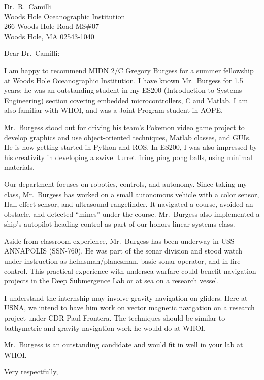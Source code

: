 \documentclass[12pt]{wrceletter}
\date{\today}
\begin{document}
\begin{letter}{%
Dr.~R.~Camilli\\
Woods Hole Oceanographic Institution\\
266 Woods Hole Road MS\#07\\
Woods Hole, MA 02543-1040}

\opening{Dear Dr.~Camilli:}
\raggedright %
\setlength{\parindent}{15pt} %

I am happy to recommend MIDN 2/C Gregory Burgess for a summer fellowship at Woods Hole Oceanographic Institution. I have known Mr.~Burgess for 1.5 years; he was an outstanding student in my ES200 (Introduction to Systems Engineering) section covering embedded microcontrollers, C and Matlab. I am also familiar with WHOI, and was a Joint Program student in AOPE. 

Mr.~Burgess stood out for driving his team's Pokemon video game project to develop graphics and use object-oriented techniques, Matlab classes, and GUIs. He is now getting started in Python and ROS. In ES200, I was also impressed by his creativity in developing a swivel turret firing ping pong balls, using minimal materials. 

Our department focuses on robotics, controls, and autonomy. Since taking my class, Mr.~Burgess has worked on a small autonomous vehicle with a color sensor, Hall-effect sensor, and ultrasound rangefinder. It navigated a course, avoided an obstacle, and detected ``mines'' under the course. Mr.~Burgess also implemented a ship's autopilot heading control as part of our honors linear systems class. 

Aside from classroom experience, Mr.~Burgess has been underway in USS ANNAPOLIS (SSN-760). He was part of the sonar division and stood watch under instruction as helmsman/planesman, basic sonar operator, and in fire control. This practical experience with undersea warfare could benefit navigation projects in the Deep Submergence Lab or at sea on a research vessel. 

I understand the internship may involve gravity navigation on gliders. Here at USNA, we intend to have him work on vector magnetic navigation on a research project under CDR Paul Frontera. The techniques should be similar to bathymetric and gravity navigation work he would do at WHOI. 

Mr.~Burgess is an outstanding candidate and would fit in well in your lab at WHOI.
\closing{Very respectfully,} %

\end{letter}
\end{document}
